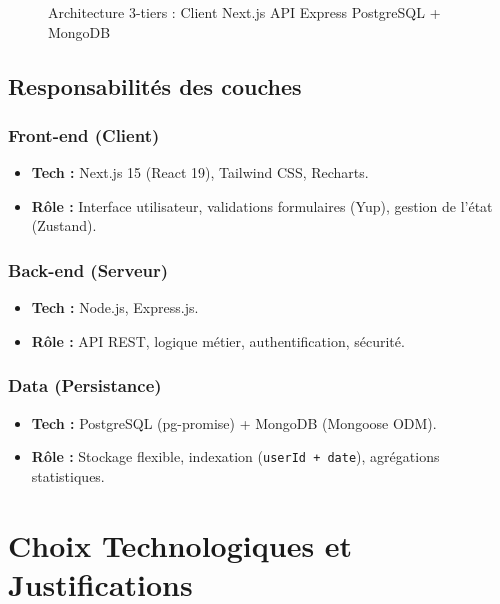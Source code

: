 \begin{figure}[H]
    \centering
    \caption{Architecture 3-tiers : Client Next.js \textrightarrow{} API Express \textrightarrow{} PostgreSQL + MongoDB}
    \label{fig:architecture-3-tiers}
\end{figure}

\subsection{Responsabilités des couches}

\subsubsection{Front-end (Client)}
\begin{itemize}
    \item \textbf{Tech :} Next.js 15 (React 19), Tailwind CSS, Recharts.
    \item \textbf{Rôle :} Interface utilisateur, validations formulaires (Yup), gestion de l'état (Zustand).
\end{itemize}

\subsubsection{Back-end (Serveur)}
\begin{itemize}
    \item \textbf{Tech :} Node.js, Express.js.
    \item \textbf{Rôle :} API REST, logique métier, authentification, sécurité.
\end{itemize}

\subsubsection{Data (Persistance)}
\begin{itemize}
    \item \textbf{Tech :} PostgreSQL (pg-promise) + MongoDB (Mongoose ODM).
    \item \textbf{Rôle :} Stockage flexible, indexation (\texttt{userId + date}), agrégations statistiques.
\end{itemize}

\section{Choix Technologiques et Justifications}

